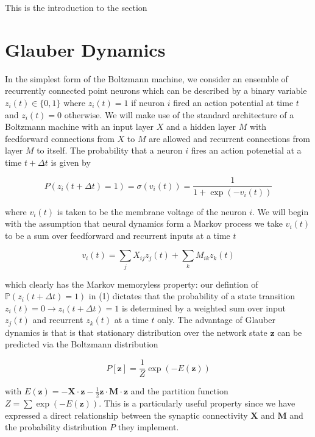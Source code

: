 \documentclass{ucetd}
\begin{document}
This is the introduction to the section

\section{Glauber Dynamics}

In the simplest form of the Boltzmann machine, we consider an ensemble of recurrently connected point neurons which can be described by a binary variable $z_{i}(t) \in \{0, 1\}$ where $z_{i}(t) = 1$ if  neuron $i$ fired an action potential at time $t$ and $z_{i}(t) = 0$ otherwise. We will make use of the standard architecture of a Boltzmann machine with an input layer $X$ and a hidden layer $M$ with feedforward connections from $X$ to $M$ are allowed and 
recurrent connections from layer $M$ to itself. The probability that a neuron $i$ fires an action potenetial at a time $t + \Delta t$ is given by 

\begin{equation}
P(z_{i}(t+\Delta t) = 1) = \sigma(v_{i}(t)) = \frac{1}{1 + \exp(-v_{i}(t))}
\end{equation}

where $v_{i}(t)$ is taken to be the membrane voltage of the neuron $i$. We will begin with the assumption that neural dynamics form a Markov process we take $v_{i}(t)$ to be a sum over feedforward and recurrent inputs at a time $t$

\begin{equation}
v_{i}(t) = \sum_{j}X_{ij}z_{j}(t) + \sum_{k}M_{ik}z_{k}(t)
\end{equation}

which clearly has the Markov memoryless property: our defintion of $\mathbb{P}(z_{i}(t+\Delta t) = 1)$ in (1) dictates that the probability of a state transition $z_{i}(t) = 0 \rightarrow z_{i}(t+\Delta t) = 1$ is determined by a weighted sum over input $z_{j}(t)$ and recurrent $z_{k}(t)$ at a time $t$ only. The advantage of Glauber dynamics is that is that stationary distribution over the network state $\mathbf{z}$ can be predicted via the Boltzmann distribution

\begin{equation}
P[\mathbf{z}] = \frac{1}{Z}\exp\left(-E(\mathbf{z})\right)
\end{equation}


with $E(\mathbf{z}) = -\mathbf{X} \cdot \mathbf{z} - \frac{1}{2}\mathbf{z}\cdot \mathbf{M} \cdot \mathbf{z}$ and the partition function $Z = \sum \exp\left(-E(\mathbf{z})\right)$. This is a particularly useful property since we have expressed a direct relationship between the synaptic connectivity $\mathbf{X}$ and $\mathbf{M}$ and the probability distribution $P$ they implement. 
\end{document}
